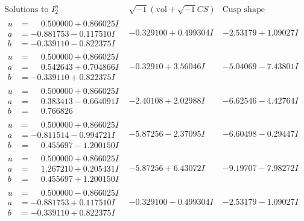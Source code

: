 \documentclass[1p]{elsarticle_modified}
\theoremstyle{definition}
\newcommand{\I}{\sqrt{-1}}
\begin{document}
$$\begin{array}{c|c|c}  
\text{Solutions to }I^u_{2}& \I (\text{vol} + \sqrt{-1}CS) & \text{Cusp shape}\\
 \hline 
\begin{aligned}
u &= \phantom{-}0.500000 + 0.866025 I \\
a &= -0.881753 - 0.117510 I \\
b &= -0.339110 - 0.822375 I\end{aligned}
 & -0.329100 + 0.499304 I & -2.53179 + 1.09027 I \\ \hline\begin{aligned}
u &= \phantom{-}0.500000 + 0.866025 I \\
a &= \phantom{-}0.542643 + 0.704866 I \\
b &= -0.339110 + 0.822375 I\end{aligned}
 & -0.32910 + 3.56046 I & -5.04069 - 7.43801 I \\ \hline\begin{aligned}
u &= \phantom{-}0.500000 + 0.866025 I \\
a &= \phantom{-}0.383413 - 0.664091 I \\
b &= \phantom{-}0.766826\phantom{ +0.000000I}\end{aligned}
 & -2.40108 + 2.02988 I & -6.62546 - 4.42764 I \\ \hline\begin{aligned}
u &= \phantom{-}0.500000 + 0.866025 I \\
a &= -0.811514 - 0.994721 I \\
b &= \phantom{-}0.455697 - 1.200150 I\end{aligned}
 & -5.87256 - 2.37095 I & -6.60498 - 0.29447 I \\ \hline\begin{aligned}
u &= \phantom{-}0.500000 + 0.866025 I \\
a &= \phantom{-}1.267210 + 0.205431 I \\
b &= \phantom{-}0.455697 + 1.200150 I\end{aligned}
 & -5.87256 + 6.43072 I & -9.19707 - 7.98272 I \\ \hline\begin{aligned}
u &= \phantom{-}0.500000 - 0.866025 I \\
a &= -0.881753 + 0.117510 I \\
b &= -0.339110 + 0.822375 I\end{aligned}
 & -0.329100 - 0.499304 I & -2.53179 - 1.09027 I \\ \hline\begin{aligned}

\end{aligned}
\end{array}$$
\end{document}
